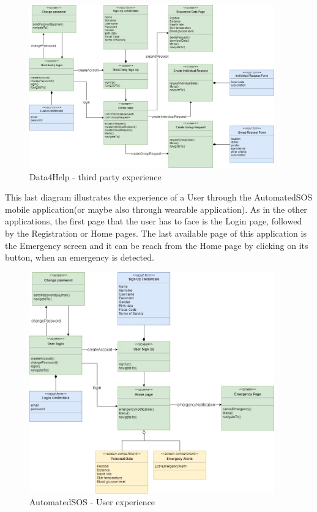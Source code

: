 \begin{figure}[ht]
    \centering
    \includegraphics[width=300pt]{images/UX/UX_Diagram2.jpg}
    \caption{Data4Help - third party experience}
    \label{UX2}
\end{figure}
\clearpage
This last diagram illustrates the experience of a User through the AutomatedSOS mobile application(or maybe also through wearable application). As in the other applications, the first page that the user has to face is the Login page, followed by the Registration or Home pages. The last available page of this application is the Emergency screen and it can be reach from the Home page by clicking on its button, when an emergency is detected.
\begin{figure}[ht]
    \centering
    \includegraphics[width=300pt]{images/UX/UX_Diagram3.jpg}
    \caption{AutomatedSOS - User experience}
    \label{UX3}
\end{figure}
\clearpage

